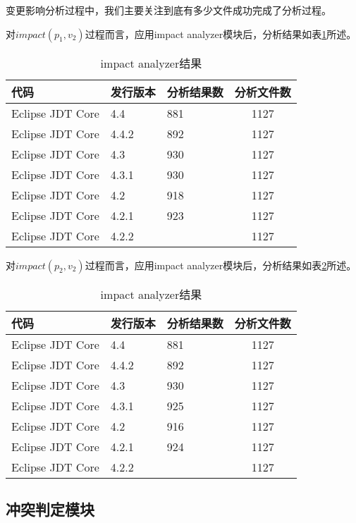 变更影响分析过程中，我们主要关注到底有多少文件成功完成了分析过程。

对$impact(p_1,v_2)$过程而言，应用impact analyzer模块后，分析结果如表\ref {data_impact_1}所述。

\begin{table}[H]
	\caption{impact analyzer结果}
	\label{data_impact_1}
	\centering
	\begin{tabular}{lllc}
		\toprule[1.5pt]
		{\heiti 代码} & {\heiti 发行版本} & {\heiti 分析结果数} & {\heiti 分析文件数} \\\midrule[1pt]
		Eclipse JDT Core & 4.4	 & 881	& 1127\\
		Eclipse JDT Core & 4.4.2 & 892	& 1127 	\\
		Eclipse JDT Core & 4.3	 & 930	& 1127		\\
		Eclipse JDT Core & 4.3.1 & 930	& 1127 	\\
		Eclipse JDT Core & 4.2 	 &	918 & 1127		\\
		Eclipse JDT Core & 4.2.1 & 923	& 1127	\\
		Eclipse JDT Core & 4.2.2  &	& 1127	\\
		\bottomrule[1.5pt]
	\end{tabular}
\end{table}

对$impact(p_2,v_2)$过程而言，应用impact analyzer模块后，分析结果如表\ref {data_impact_2}所述。

\begin{table}[H]
	\caption{impact analyzer结果}
	\label{data_impact_2}
	\centering
	\begin{tabular}{lllc}
		\toprule[1.5pt]
		{\heiti 代码} & {\heiti 发行版本} & {\heiti 分析结果数} & {\heiti 分析文件数} \\\midrule[1pt]
		Eclipse JDT Core & 4.4	 & 881	& 1127\\
		Eclipse JDT Core & 4.4.2 & 892	& 1127 	\\
		Eclipse JDT Core & 4.3	 & 930	& 1127		\\
		Eclipse JDT Core & 4.3.1 & 925	& 1127 	\\
		Eclipse JDT Core & 4.2 	 & 916	& 1127		\\
		Eclipse JDT Core & 4.2.1 	 & 924	& 1127	\\
		Eclipse JDT Core & 4.2.2 	 &	& 1127	\\
		\bottomrule[1.5pt]
	\end{tabular}
\end{table}


\subsection{冲突判定模块}

